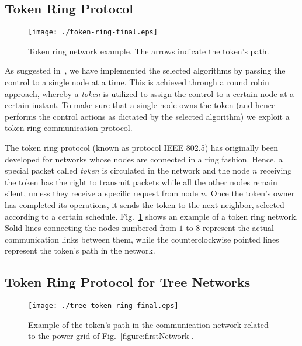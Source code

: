\documentclass[journal]{IEEEtran}
\newcommand{\fig}[1]{Fig.~\ref{#1}}
\begin{document}
\subsection{Token Ring Protocol}

\begin{figure}
\centering
\texttt{[image: ./token-ring-final.eps]}
\caption{Token ring network example. The arrows indicate the token's path. 
\label{figure:tokenRing}}
\end{figure}

As suggested in~\cite{SurroundControl}, we have implemented the selected algorithms by passing the control to a single node at a time. This is achieved through a round robin approach, whereby a {\it token} is utilized to assign the control to a certain node at a certain instant. To make sure that a single node owns the token (and hence performs the control actions as dictated by the selected algorithm) we exploit a token ring communication protocol.   

The token ring protocol (known as protocol IEEE 802.5) has originally been developed for networks whose nodes are connected in a ring fashion. Hence, a special packet called \emph{token} is circulated in the network and the node $n$ receiving the token has the right to transmit packets while all the other nodes remain silent, unless they receive a specific request from node $n$. Once the token's owner has completed its operations, it sends the token to the next neighbor, selected according to a certain schedule. \fig{figure:tokenRing} shows an example of a token ring network. Solid lines connecting the nodes numbered from $1$ to $8$ represent the actual communication links between them, while the counterclockwise pointed lines represent the token's path in the network.

\subsection{Token Ring Protocol for Tree Networks}
\label{ssec:NOS}
\begin{figure}
\centering
\texttt{[image: ./tree-token-ring-final.eps]}
\caption{Example of the token's path in the communication network related to the power grid of \fig{figure:firstNetwork}.\label{figure:treeTokenRing}}
\end{figure}
\end{document}
